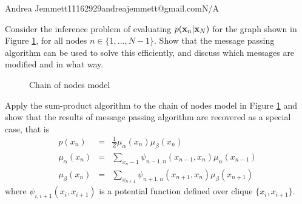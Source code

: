 \documentclass{amsmlaj}
\begin{document}
{Andrea Jemmett}{11162929}{andreajemmett@gmail.com}{N/A}

\begin{problem}
Consider the inference problem of evaluating $p(\bm{\mathbf{x}}_n|\bm{\mathbf{x}}_N)$ for the
graph shown in Figure \ref{fig:chain}, for all nodes $n \in \{1,\dotsc,N-1\}$.
Show that the message passing algorithm can be used to solve this efficiently,
and discuss which messages are modified and in what way.

\begin{figure}[H]
\begin{center}
\caption{Chain of nodes model}
\label{fig:chain}
\end{center}
\end{figure}
\end{problem}

\begin{problem}
Apply the sum-product algorithm to the chain of nodes model in Figure
\ref{fig:chain}  and show that the results of message passing algorithm are
recovered as a special case, that is
\begin{eqnarray}
p(x_n) & = & \frac{1}{Z}\mu_\alpha(x_n)\mu_\beta(x_n) \nonumber\\
\mu_\alpha(x_n) & = & \sum\limits_{x_n-1} \psi_{n-1,n}(x_{n-1},x_n)\mu_\alpha(x_{n-1}) \nonumber\\
\mu_\beta(x_n) & = & \sum\limits_{x_{n+1}} \psi_{n+1,n}(x_{n+1},x_n)\mu_\beta(x_{n+1}) \nonumber
\end{eqnarray}
where $\psi_{i,i+1}(x_i,x_{i+1})$ is a potential function defined over clique $\{x_i,x_{i+1}\}$.
\end{problem}
\end{document}
